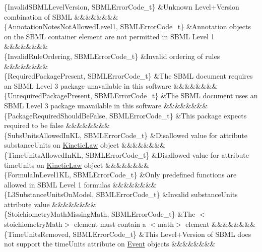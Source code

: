 \begin{DoxyParagraph}{}
\begin{longtabu}
\{Invalid\+S\+B\+M\+L\+Level\+Version, S\+B\+M\+L\+Error\+Code\+\_\+t\} &Unknown Level+\+Version combination of S\+B\+ML &&&&&&&&\\
\{Annotation\+Notes\+Not\+Allowed\+Level1, S\+B\+M\+L\+Error\+Code\+\_\+t\} &Annotation objects on the S\+B\+ML container element are not permitted in S\+B\+ML Level 1 &&&&&&&&\\
\{Invalid\+Rule\+Ordering, S\+B\+M\+L\+Error\+Code\+\_\+t\} &Invalid ordering of rules &&&&&&&&\\
\{Required\+Package\+Present, S\+B\+M\+L\+Error\+Code\+\_\+t\} &The S\+B\+ML document requires an S\+B\+ML Level 3 package unavailable in this software &&&&&&&&\\
\{Unrequired\+Package\+Present, S\+B\+M\+L\+Error\+Code\+\_\+t\} &The S\+B\+ML document uses an S\+B\+ML Level 3 package unavailable in this software &&&&&&&&\\
\{Package\+Required\+Should\+Be\+False, S\+B\+M\+L\+Error\+Code\+\_\+t\} &This package expects required to be false &&&&&&&&\\
\{Subs\+Units\+Allowed\+In\+KL, S\+B\+M\+L\+Error\+Code\+\_\+t\} &Disallowed value for attribute \textquotesingle{}substance\+Units\textquotesingle{} on \hyperlink{class_kinetic_law}{Kinetic\+Law} object &&&&&&&&\\
\{Time\+Units\+Allowed\+In\+KL, S\+B\+M\+L\+Error\+Code\+\_\+t\} &Disallowed value for attribute \textquotesingle{}time\+Units\textquotesingle{} on \hyperlink{class_kinetic_law}{Kinetic\+Law} object &&&&&&&&\\
\{Formula\+In\+Level1\+KL, S\+B\+M\+L\+Error\+Code\+\_\+t\} &Only predefined functions are allowed in S\+B\+ML Level 1 formulas &&&&&&&&\\
\{L3\+Substance\+Units\+On\+Model, S\+B\+M\+L\+Error\+Code\+\_\+t\} &Invalid \textquotesingle{}substance\+Units\textquotesingle{} attribute value &&&&&&&&\\
\{Stoichiometry\+Math\+Missing\+Math, S\+B\+M\+L\+Error\+Code\+\_\+t\} &The {\ttfamily $<$stoichiometry\+Math$>$} element must contain a {\ttfamily $<$math$>$} element &&&&&&&&\\
\{Time\+Units\+Removed, S\+B\+M\+L\+Error\+Code\+\_\+t\} &This Level+\+Version of S\+B\+ML does not support the \textquotesingle{}time\+Units\textquotesingle{} attribute on \hyperlink{class_event}{Event} objects &&&&&&&&\\

\end{longtabu}
\end{DoxyParagraph}
